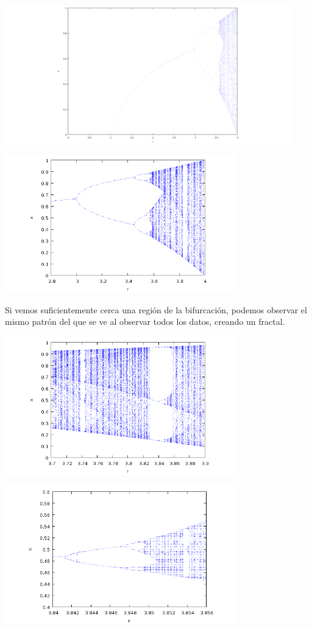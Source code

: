 \documentclass[a4paper]{article}
\begin{document}
\begin{center}
\includegraphics[height=6cm]{grafica3-1.png}
\end{center}

\begin{center}
\includegraphics[height=6cm]{grafica3-2.png}
\end{center}

Si vemos suficientemente cerca una región de la bifurcación, podemos observar el mismo patrón del que se ve al observar todos los datos, creando un fractal.

\begin{center}
\includegraphics[height=6cm]{grafica3-3.png}
\end{center}

\begin{center}
\includegraphics[height=6cm]{grafica3-4.png}
\end{center}
\end{document}
